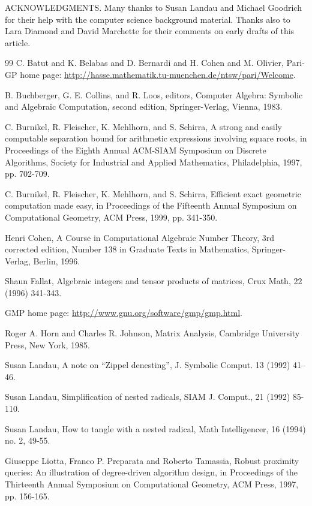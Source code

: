 \documentclass[11pt,letterpaper]{article}
\begin{document}
ACKNOWLEDGMENTS. Many thanks to Susan Landau and Michael Goodrich for their help with the computer science background material. Thanks also to Lara Diamond and David Marchette for their comments on early drafts of this article.

\begin{thebibliography}{99}
 C. Batut and K. Belabas and D. Bernardi and H. Cohen and M. Olivier, Pari-GP home page: \href{http://hasse.mathematik.tu-muenchen.de/ntsw/pari/Welcome}{http://hasse.mathematik.tu-muenchen.de/ntsw/pari/Welcome}.

 B. Buchberger, G. E. Collins, and R. Loos, editors, Computer Algebra: Symbolic and Algebraic Computation, second edition, Springer-Verlag, Vienna, 1983.

 C. Burnikel, R. Fleischer, K. Mehlhorn, and S. Schirra, A strong and easily computable separation bound for arithmetic expressions involving square roots, in Proceedings of the Eighth Annual ACM-SIAM Symposium on Discrete Algorithms, Society for Industrial and Applied Mathematics, Philadelphia, 1997, pp. 702-709.

 C. Burnikel, R. Fleischer, K. Mehlhorn, and S. Schirra, Efficient exact geometric computation made easy, in Proceedings of the Fifteenth Annual Symposium on Computational Geometry, ACM Press, 1999, pp. 341-350.

 Henri Cohen, A Course in Computational Algebraic Number Theory, 3rd corrected edition, Number 138 in Graduate Texts in Mathematics, Springer-Verlag, Berlin, 1996.

 Shaun Fallat, Algebraic integers and tensor products of matrices, Crux Math, 22 (1996) 341-343.

 GMP home page: \href{http://www.gnu.org/software/gmp/gmp.html}{http://www.gnu.org/software/gmp/gmp.html}.

 Roger A. Horn and Charles R. Johnson, Matrix Analysis, Cambridge University Press, New York, 1985.

 Susan Landau, A note on ``Zippel denesting'', J. Symbolic Comput. 13 (1992) 41--46.

 Susan Landau, Simplification of nested radicals, SIAM J. Comput., 21 (1992) 85-110.

 Susan Landau, How to tangle with a nested radical, Math Intelligencer, 16 (1994) no. 2, 49-55.

 Giuseppe Liotta, Franco P. Preparata and Roberto Tamassia, Robust proximity queries: An illustration of degree-driven algorithm design, in Proceedings of the Thirteenth Annual Symposium on Computational Geometry, ACM Press, 1997, pp. 156-165.


\end{thebibliography}
\end{document}

